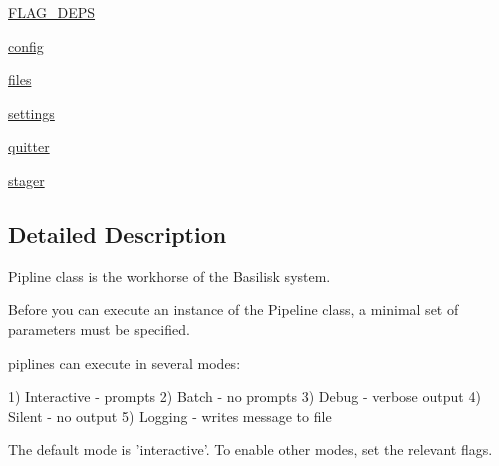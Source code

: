 \begin{DoxyCompactItemize}
\item 
\hyperlink{classpipeline_1_1_pipeline_a7e8a89d9fa5d41fa20523dbfbb249f3f}{\-F\-L\-A\-G\-\_\-\-D\-E\-P\-S}
\item 
\hyperlink{classpipeline_1_1_pipeline_a3b48565560db847600347ebc1900e0b5}{config}
\item 
\hyperlink{classpipeline_1_1_pipeline_a638a81af93bd7d50a9a65a8fcc91244a}{files}
\item 
\hyperlink{classpipeline_1_1_pipeline_a05a0191f3036ce38a324a47b621ed04c}{settings}
\item 
\hyperlink{classpipeline_1_1_pipeline_a857dfce5324c19414e4a9dad7a37f1f6}{quitter}
\item 
\hyperlink{classpipeline_1_1_pipeline_a4d4fe65f6db61202b18851125ece0d73}{stager}
\end{DoxyCompactItemize}


\subsection{\-Detailed \-Description}
\begin{DoxyVerb}
Pipline class is the workhorse of the Basilisk system.

Before you can execute an instance of the Pipeline class,
a minimal set of parameters must be specified.

piplines can execute in several modes:

    1) Interactive - prompts
    2) Batch - no prompts
    3) Debug - verbose output
    4) Silent - no output
    5) Logging - writes message to file

The default mode is 'interactive'. To enable other modes,
set the relevant flags.
\end{DoxyVerb}
 


